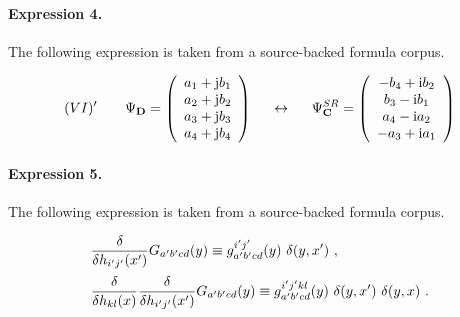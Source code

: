 \documentclass[11pt]{article}
\begin{document}
\paragraph{Expression 4.} The following expression is taken from a source-backed formula corpus.

\begin{align*}(VI)' \hspace{7mm} \Psi_{\bf D} =\left(\begin{array}{c}a_1 +{\rm j}b_1 \\a_2 +{\rm j}b_2 \\a_3 +{\rm j}b_3 \\a_4 +{\rm j}b_4\end{array}\right) \hspace{5mm} \leftrightarrow \hspace{5mm}\Psi^{SR}_{\bf C} =\left(\begin{array}{c}-b_4+{\rm i}b_2 \\b_3-{\rm i}b_1 \\a_4-{\rm i}a_2 \\-a_3+{\rm i}a_1\end{array}\right)\end{align*}

\paragraph{Expression 5.} The following expression is taken from a source-backed formula corpus.

\begin{align*}\begin{array}{l}\displaystyle{ \frac{\delta}{\delta h_{i'j'}(x')} } G_{a'b'cd}(y) \equiv g^{i'j'}_{a'b'cd}(y)~ \delta(y,x') \ , \vspace{2mm}\\\displaystyle{\frac{\delta}{\delta h_{kl}(x)} \frac{\delta}{\delta h_{i'j'}(x')} } G_{a'b'cd}(y) \equiv g^{i'j'kl}_{a'b'cd}(y)~ \delta(y,x') ~\delta(y,x) \ .\end{array}\end{align*}
\end{document}
